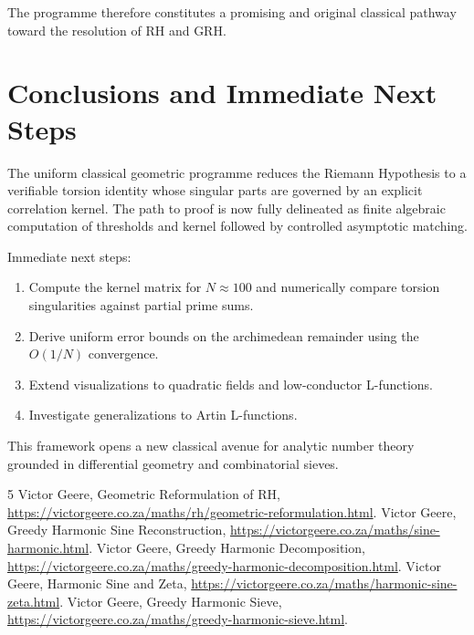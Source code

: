\documentclass[11pt,a4paper]{article}
\begin{document}
The programme therefore constitutes a promising and original classical pathway toward the resolution of RH and GRH.

\section{Conclusions and Immediate Next Steps}

The uniform classical geometric programme reduces the Riemann Hypothesis to a verifiable torsion identity whose singular parts are governed by an explicit correlation kernel. The path to proof is now fully delineated as finite algebraic computation of thresholds and kernel followed by controlled asymptotic matching.

Immediate next steps:
\begin{enumerate}
\item Compute the kernel matrix for \(N \approx 100\) and numerically compare torsion singularities against partial prime sums.
\item Derive uniform error bounds on the archimedean remainder using the \(O(1/N)\) convergence.
\item Extend visualizations to quadratic fields and low-conductor L-functions.
\item Investigate generalizations to Artin L-functions.
\end{enumerate}

This framework opens a new classical avenue for analytic number theory grounded in differential geometry and combinatorial sieves.


\begin{thebibliography}{5}
 Victor Geere, Geometric Reformulation of RH, \url{https://victorgeere.co.za/maths/rh/geometric-reformulation.html}.
 Victor Geere, Greedy Harmonic Sine Reconstruction, \url{https://victorgeere.co.za/maths/sine-harmonic.html}.
 Victor Geere, Greedy Harmonic Decomposition, \url{https://victorgeere.co.za/maths/greedy-harmonic-decomposition.html}.
 Victor Geere, Harmonic Sine and Zeta, \url{https://victorgeere.co.za/maths/harmonic-sine-zeta.html}.
 Victor Geere, Greedy Harmonic Sieve, \url{https://victorgeere.co.za/maths/greedy-harmonic-sieve.html}.
\end{thebibliography}
\end{document}
